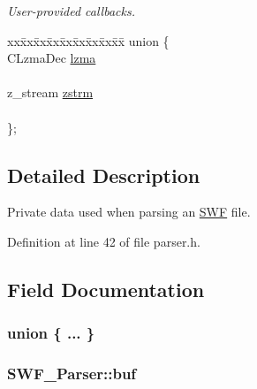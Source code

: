 \begin{DoxyCompactItemize}
\begin{DoxyCompactList}\small\item\em User-\/provided callbacks. \end{DoxyCompactList}\item 
\begin{tabbing}
xx\=xx\=xx\=xx\=xx\=xx\=xx\=xx\=xx\=\kill
union \{\\
\>CLzmaDec \hyperlink{struct_s_w_f___parser_a1bbb269f3afac19005232a222d87d054}{lzma}\\
\>\\
\>z\_stream \hyperlink{struct_s_w_f___parser_adbcdea5d290997995b3924c361f9fb43}{zstrm}\\
\>\\
\}; \\

\end{tabbing}\end{DoxyCompactItemize}


\subsection{Detailed Description}
Private data used when parsing an \hyperlink{struct_s_w_f}{S\-W\-F} file. 

Definition at line 42 of file parser.\-h.



\subsection{Field Documentation}
\hypertarget{struct_s_w_f___parser_a15374f3a7d108a724c0e9a6513aaa070}{\subsubsection[{"@1}]{\setlength{\rightskip}{0pt plus 5cm}union \{ ... \} }}\label{struct_s_w_f___parser_a15374f3a7d108a724c0e9a6513aaa070}
\hypertarget{struct_s_w_f___parser_aee4f16e3f852e7ac2e0eeac8795a15cf}{
\subsubsection[{buf}]{ S\-W\-F\-\_\-\-Parser\-::buf}}\label{struct_s_w_f___parser_aee4f16e3f852e7ac2e0eeac8795a15cf}


